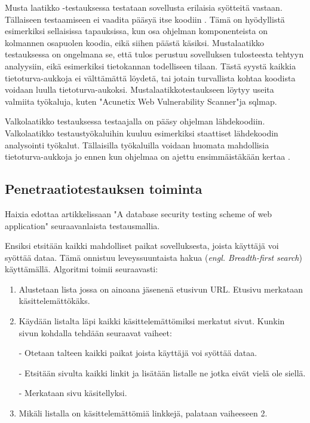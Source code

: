 \documentclass[finnish]{tktltiki2}
\theoremstyle{definition}
\theoremstyle{remark}
\begin{document}
	Musta laatikko -testauksessa testataan sovellusta erilaisia syötteitä vastaan. Tällaiseen testaamiseen ei vaadita pääsyä itse koodiin \cite{testing2}. Tämä on hyödyllistä esimerkiksi sellaisissa tapauksissa, kun osa ohjelman komponenteista on kolmannen osapuolen koodia, eikä siihen päästä käsiksi. Mustalaatikko testauksessa on ongelmana se, että tulos perustuu sovelluksen tulosteesta tehtyyn analyysiin, eikä esimerkiksi tietokannan todelliseen tilaan. Tästä syystä kaikkia tietoturva-aukkoja ei välttämättä löydetä, tai jotain turvallista kohtaa koodista voidaan luulla tietoturva-aukoksi. Mustalaatikkotestaukseen löytyy useita valmiita työkaluja, kuten "Acunetix Web Vulnerability Scanner"\space ja sqlmap.
	
	Valkolaatikko testauksessa testaajalla on pääsy ohjelman lähdekoodiin. Valkolaatikko testaustyökaluihin kuuluu esimerkiksi staattiset lähdekoodin analysointi työkalut. Tällaisilla työkaluilla voidaan huomata mahdollisia tietoturva-aukkoja jo ennen kun ohjelmaa on ajettu ensimmäistäkään kertaa \cite{valkolaatikko}.
	
	\subsection{Penetraatiotestauksen toiminta}
	 Haixia edottaa artikkelissaan "A database security testing scheme of web application" \cite{testing} seuraavanlaista testausmallia.
	
	Ensiksi etsitään kaikki mahdolliset paikat sovelluksesta, joista käyttäjä voi syöttää dataa. Tämä onnistuu leveyssuuntaista hakua (\textit{engl. Breadth-first search}) käyttämällä. Algoritmi toimii seuraavasti:
	\begin{enumerate}
		\item Alustetaan lista jossa on ainoana jäsenenä etusivun URL. Etusivu merkataan käsittelemättökäks.
		
		\item Käydään listalta läpi kaikki käsittelemättömiksi merkatut sivut. Kunkin sivun kohdalla tehdään seuraavat vaiheet:
		
		- Otetaan talteen kaikki paikat joista käyttäjä voi syöttää dataa.
		
		- Etsitään sivulta kaikki linkit ja lisätään listalle ne jotka eivät vielä ole siellä.
		
		- Merkataan sivu käsitellyksi.
		
		\item Mikäli listalla on käsittelemättömiä linkkejä, palataan vaiheeseen 2.
	\end{enumerate}
	
\end{document}

